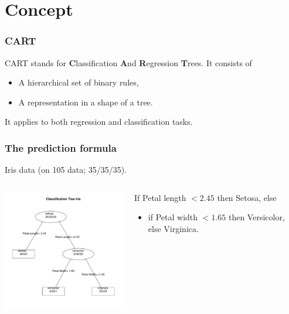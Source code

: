 \section{Concept}
\begin{frame}
\frametitle{CART}
CART stands for {\bf C}lassification {\bf A}nd {\bf R}egression {\bf T}rees. It consists of 
\begin{itemize}
\item A hierarchical set of binary rules,
\item A representation in a shape of a tree.
\end{itemize}
It applies to both regression and classification tasks.
\end{frame}
\begin{frame}
\frametitle{The prediction formula}
Iris data (on 105 data; 35/35/35).
\begin{columns}
\begin{column}{0.5\textwidth}
\begin{center}
\includegraphics[width=6.5cm]{../../Graphs/IRIS_CART.pdf}
\end{center}
\end{column}
\begin{column}{0.5\textwidth}
\small
If Petal length $< 2.45$ then Setosa, else
\begin{itemize}
\item if Petal width $< 1.65$ then Versicolor, else Virginica.
\end{itemize}
\end{column}
\end{columns}
\end{frame}
